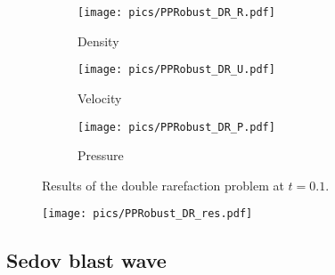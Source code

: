 \begin{figure}[htbp]
    \centering
    \begin{subfigure}{0.33\textwidth}
        \texttt{[image: pics/PPRobust\_DR\_R.pdf]}
        \caption[]{Density}
    \end{subfigure}\hfill
    \begin{subfigure}{0.33\textwidth}
        \texttt{[image: pics/PPRobust\_DR\_U.pdf]}
        \caption[]{Velocity}
    \end{subfigure}\hfill
    \begin{subfigure}{0.33\textwidth}
        \texttt{[image: pics/PPRobust\_DR\_P.pdf]}
        \caption[]{Pressure}
    \end{subfigure}
    \caption{Results of the double rarefaction problem at $t=0.1$.}
    \label{fig:doubleRare}
\end{figure}

\begin{figure}[htbp!]
    \centering
    \texttt{[image: pics/PPRobust\_DR\_res.pdf]}
    \caption{}
    \label{fig:DRres}
\end{figure}




\subsection{Sedov blast wave}
\label{ssec:sedov}

